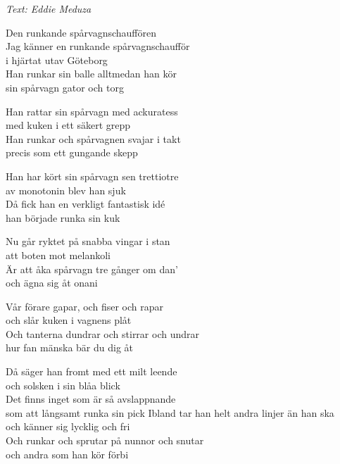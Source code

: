 {\footnotesize\textit{Text: Eddie Meduza}}\par
\vspace{10pt}
Den runkande spårvagnschauffören\\
Jag känner en runkande spårvagnschaufför\\
i hjärtat utav Göteborg\\
Han runkar sin balle alltmedan han kör\\
sin spårvagn gator och torg\par
\vspace{7pt}
Han rattar sin spårvagn med ackuratess\\
med kuken i ett säkert grepp\\
Han runkar och spårvagnen svajar i takt\\
precis som ett gungande skepp\par
\vspace{7pt}
Han har kört sin spårvagn sen trettiotre\\
av monotonin blev han sjuk\\
Då fick han en verkligt fantastisk idé\\
han började runka sin kuk\par
\vspace{7pt}
Nu går ryktet på snabba vingar i stan\\
att boten mot melankoli\\
Är att åka spårvagn tre gånger om dan’\\
och ägna sig åt onani\par
\vspace{7pt}
Vår förare gapar, och fiser och rapar\\
och slår kuken i vagnens plåt\\
Och tanterna dundrar och stirrar och undrar\\
hur fan mänska bär du dig åt\par
\vspace{7pt}
Då säger han fromt med ett milt leende\\
och solsken i sin blåa blick\\
Det finns inget som är så avslappnande\\
som att långsamt runka sin pick
\newpage
Ibland tar han helt andra linjer än han ska\\
och känner sig lycklig och fri\\
Och runkar och sprutar på nunnor och snutar\\
och andra som han kör förbi\par
